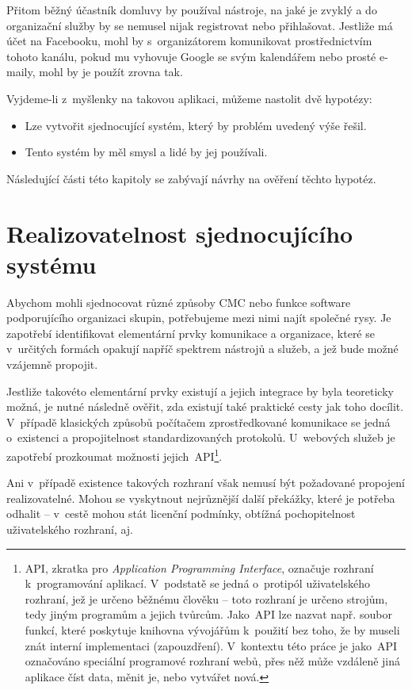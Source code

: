 \documentclass[12pt,oneside,final]{fithesis2}
\begin{document}
Přitom běžný účastník domluvy by používal nástroje, na jaké je zvyklý a do organizační služby by se nemusel nijak registrovat nebo přihlašovat. Jestliže má účet na Facebooku, mohl by s~organizátorem komunikovat pro\-střed\-nic\-tvím tohoto kanálu, pokud mu vyhovuje Google se svým kalendářem nebo prosté e-maily, mohl by je použít zrovna tak.

Vyjdeme-li z~myšlenky na takovou aplikaci, můžeme nastolit dvě hypotézy:

\begin{itemize}
    \item Lze vytvořit sjednocující systém, který by problém uvedený výše řešil.
    \item Tento systém by měl smysl a lidé by jej používali.
\end{itemize}

Následující části této kapitoly se zabývají návrhy na ověření těchto hypotéz.


\section{Realizovatelnost sjednocujícího systému}\label{realizability}
Abychom mohli sjednocovat různé způsoby CMC nebo funkce software podporujícího organizaci skupin, potřebujeme mezi nimi najít společné rysy. Je zapotřebí identifikovat elementární prvky komunikace a organizace, které se v~určitých formách opakují napříč spektrem nástrojů a služeb, a jež bude možné vzájemně propojit.

Jestliže takovéto elementární prvky existují a jejich integrace by byla teoreticky možná, je nutné následně ověřit, zda existují také praktické cesty jak toho docílit. V~případě klasických způsobů počítačem zprostředkované komunikace se jedná o~existenci a propojitelnost standardizovaných protokolů. U~webových služeb je zapotřebí prozkoumat možnosti jejich~API\footnote{API, zkratka pro \emph{Application Programming Interface}, označuje rozhraní k~programování aplikací. V~podstatě se jedná o~protipól uživatelského rozhraní, jež je určeno běžnému člověku -- toto rozhraní je určeno strojům, tedy jiným programům a jejich tvůrcům. Jako~API lze nazvat např. soubor funkcí, které poskytuje knihovna vývojářům k~použití bez toho, že by museli znát interní implementaci (zapouzdření). V~kontextu této práce je jako~API označováno speciální programové rozhraní webů, přes něž může vzdáleně jiná aplikace číst data, měnit je, nebo vytvářet nová.}.

Ani v~případě existence takových rozhraní však nemusí být požadované propojení realizovatelné. Mohou se vyskytnout nejrůznější další překážky, které je potřeba odhalit -- v~cestě mohou stát licenční podmínky, obtížná pochopitelnost uživatelského rozhraní, aj.
\end{document}
